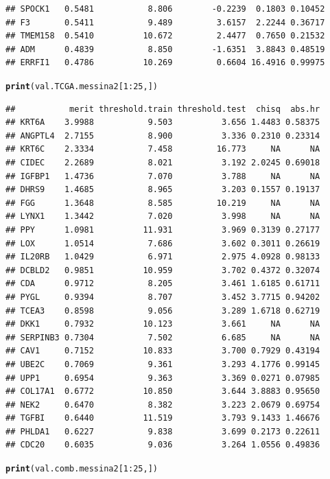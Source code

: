 \documentclass{article}\usepackage[]{graphicx}\usepackage[]{color}
\makeatletter
\newcommand{\hlnum}[1]{\textcolor[rgb]{0.686,0.059,0.569}{#1}}%
\newcommand{\hlopt}[1]{\textcolor[rgb]{0,0,0}{#1}}%
\newcommand{\hlstd}[1]{\textcolor[rgb]{0.345,0.345,0.345}{#1}}%
\newcommand{\hlkwd}[1]{\textcolor[rgb]{0.737,0.353,0.396}{\textbf{#1}}}%
\newenvironment{kframe}{%
 \def\at@end@of@kframe{}%
 \ifinner\ifhmode%
  \def\at@end@of@kframe{\end{minipage}}%
  \begin{minipage}{\columnwidth}%
 \fi\fi%
 \def\FrameCommand##1{\hskip\@totalleftmargin \hskip-\fboxsep
 \colorbox{shadecolor}{##1}\hskip-\fboxsep
     \hskip-\linewidth \hskip-\@totalleftmargin \hskip\columnwidth}%
 \MakeFramed {\advance\hsize-\width
   \@totalleftmargin\z@ \linewidth\hsize
   \@setminipage}}%
 {\par\unskip\endMakeFramed%
 \at@end@of@kframe}
\newenvironment{knitrout}{}{} %
\makeatother
\begin{document}
\begin{knitrout}
\begin{kframe}
\begin{verbatim}
## SPOCK1   0.5481           8.806        -0.2239  0.1803 0.10452
## F3       0.5411           9.489         3.6157  2.2244 0.36717
## TMEM158  0.5410          10.672         2.4477  0.7650 0.21532
## ADM      0.4839           8.850        -1.6351  3.8843 0.48519
## ERRFI1   0.4786          10.269         0.6604 16.4916 0.99975
\end{verbatim}
\begin{alltt}
\hlkwd{print}\hlstd{(val.TCGA.messina2[}\hlnum{1}\hlopt{:}\hlnum{25}\hlstd{,])}
\end{alltt}
\begin{verbatim}
##           merit threshold.train threshold.test  chisq  abs.hr
## KRT6A    3.9988           9.503          3.656 1.4483 0.58375
## ANGPTL4  2.7155           8.900          3.336 0.2310 0.23314
## KRT6C    2.3334           7.458         16.773     NA      NA
## CIDEC    2.2689           8.021          3.192 2.0245 0.69018
## IGFBP1   1.4736           7.070          3.788     NA      NA
## DHRS9    1.4685           8.965          3.203 0.1557 0.19137
## FGG      1.3648           8.585         10.219     NA      NA
## LYNX1    1.3442           7.020          3.998     NA      NA
## PPY      1.0981          11.931          3.969 0.3139 0.27177
## LOX      1.0514           7.686          3.602 0.3011 0.26619
## IL20RB   1.0429           6.971          2.975 4.0928 0.98133
## DCBLD2   0.9851          10.959          3.702 0.4372 0.32074
## CDA      0.9712           8.205          3.461 1.6185 0.61711
## PYGL     0.9394           8.707          3.452 3.7715 0.94202
## TCEA3    0.8598           9.056          3.289 1.6718 0.62719
## DKK1     0.7932          10.123          3.661     NA      NA
## SERPINB3 0.7304           7.502          6.685     NA      NA
## CAV1     0.7152          10.833          3.700 0.7929 0.43194
## UBE2C    0.7069           9.361          3.293 4.1776 0.99145
## UPP1     0.6954           9.363          3.369 0.0271 0.07985
## COL17A1  0.6772          10.850          3.644 3.8883 0.95650
## NEK2     0.6470           8.382          3.223 2.0679 0.69754
## TGFBI    0.6440          11.519          3.793 9.1433 1.46676
## PHLDA1   0.6227           9.838          3.699 0.2173 0.22611
## CDC20    0.6035           9.036          3.264 1.0556 0.49836
\end{verbatim}
\begin{alltt}
\hlkwd{print}\hlstd{(val.comb.messina2[}\hlnum{1}\hlopt{:}\hlnum{25}\hlstd{,])}
\end{alltt}
\begin{verbatim}

\end{verbatim}
\end{kframe}
\end{knitrout}
\end{document}
